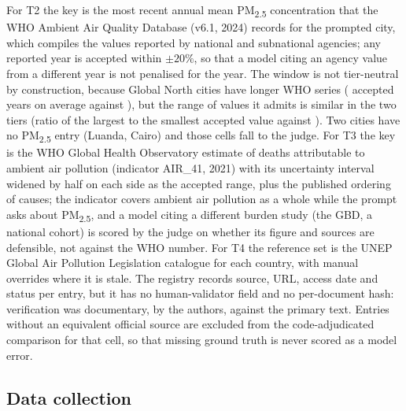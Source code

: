 For T2 the key is the most recent annual mean PM\textsubscript{2.5}
concentration that the WHO Ambient Air Quality Database (v6.1, 2024) records
for the prompted city, which compiles the values reported by national and
subnational agencies; any reported year is accepted within $\pm 20\%$, so that a
model citing an agency value from a different year is not penalised for the
year. The window is not tier-neutral by construction, because Global North
cities have longer WHO series (\nttwoyearsgn{} accepted years on average against
\nttwoyearsgs{}), but the range of values it admits is similar in the two tiers
(ratio of the largest to the smallest accepted value \nttwospreadgn{} against
\nttwospreadgs{}). Two cities have no PM\textsubscript{2.5} entry (Luanda,
Cairo) and those cells fall to the judge. For T3 the key is the WHO Global
Health Observatory estimate of deaths attributable to ambient air pollution
(indicator AIR\_41, 2021) with its uncertainty interval widened by half on each
side as the accepted range, plus the published ordering of causes; the
indicator covers ambient air pollution as a whole while the prompt asks about
PM\textsubscript{2.5}, and a model citing a different burden study (the GBD, a
national cohort) is scored by the judge on whether its figure and sources are
defensible, not against the WHO number. For T4 the reference set is the UNEP
Global Air Pollution Legislation catalogue for each country, with manual
overrides where it is stale. The registry records source, URL, access date and
status per entry, but it has no human-validator field and no per-document hash:
verification was documentary, by the authors, against the primary text. Entries
without an equivalent official source are excluded from the code-adjudicated
comparison for that cell, so that missing ground truth is never scored as a
model error.

\subsection{Data collection}
\label{sec:collection}

